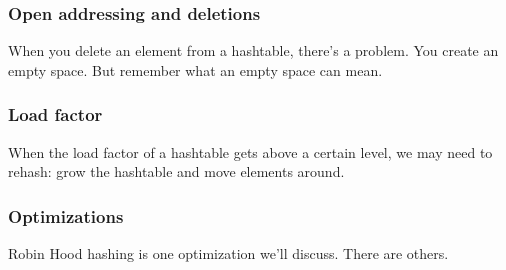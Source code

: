 \documentclass[aspectratio=169]{beamer}
\begin{document}
\begin{frame}
    \frametitle{Open addressing and deletions}

    When you delete an element from a hashtable, there's a problem. You
    create an empty space. But remember what an empty space can mean.
\end{frame}

\begin{frame}
    \frametitle{Load factor}

    When the load factor of a hashtable gets above a certain level, we may
    need to rehash: grow the hashtable and move elements around.
\end{frame}

\begin{frame}
    \frametitle{Optimizations}

    Robin Hood hashing is one optimization we'll discuss. There are others.
\end{frame}
\end{document}
